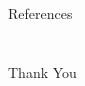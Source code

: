 \documentclass[xcolor=dvipsnames,aspectratio=169]{beamer}
\begin{document}




\section{}
\begin{frame}[allowframebreaks]{References} 
\footnotesize


\end{frame}
\section{}
\begin{frame}{}
\LARGE
\centerline{Thank You}
    
\end{frame}


\end{document}
